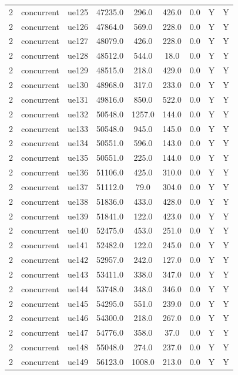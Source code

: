 \begin{table}[ht]
\begin{tabular}{|c|c|c|c|c|c|c|c|c|}
2 & concurrent & ue125 & 47235.0 & 296.0 & 426.0 & 0.0 & Y & Y \\
2 & concurrent & ue126 & 47864.0 & 569.0 & 228.0 & 0.0 & Y & Y \\
2 & concurrent & ue127 & 48079.0 & 426.0 & 228.0 & 0.0 & Y & Y \\
2 & concurrent & ue128 & 48512.0 & 544.0 & 18.0 & 0.0 & Y & Y \\
2 & concurrent & ue129 & 48515.0 & 218.0 & 429.0 & 0.0 & Y & Y \\
2 & concurrent & ue130 & 48968.0 & 317.0 & 233.0 & 0.0 & Y & Y \\
2 & concurrent & ue131 & 49816.0 & 850.0 & 522.0 & 0.0 & Y & Y \\
2 & concurrent & ue132 & 50548.0 & 1257.0 & 144.0 & 0.0 & Y & Y \\
2 & concurrent & ue133 & 50548.0 & 945.0 & 145.0 & 0.0 & Y & Y \\
2 & concurrent & ue134 & 50551.0 & 596.0 & 143.0 & 0.0 & Y & Y \\
2 & concurrent & ue135 & 50551.0 & 225.0 & 144.0 & 0.0 & Y & Y \\
2 & concurrent & ue136 & 51106.0 & 425.0 & 310.0 & 0.0 & Y & Y \\
2 & concurrent & ue137 & 51112.0 & 79.0 & 304.0 & 0.0 & Y & Y \\
2 & concurrent & ue138 & 51836.0 & 433.0 & 428.0 & 0.0 & Y & Y \\
2 & concurrent & ue139 & 51841.0 & 122.0 & 423.0 & 0.0 & Y & Y \\
2 & concurrent & ue140 & 52475.0 & 453.0 & 251.0 & 0.0 & Y & Y \\
2 & concurrent & ue141 & 52482.0 & 122.0 & 245.0 & 0.0 & Y & Y \\
2 & concurrent & ue142 & 52957.0 & 242.0 & 127.0 & 0.0 & Y & Y \\
2 & concurrent & ue143 & 53411.0 & 338.0 & 347.0 & 0.0 & Y & Y \\
2 & concurrent & ue144 & 53748.0 & 348.0 & 346.0 & 0.0 & Y & Y \\
2 & concurrent & ue145 & 54295.0 & 551.0 & 239.0 & 0.0 & Y & Y \\
2 & concurrent & ue146 & 54300.0 & 218.0 & 267.0 & 0.0 & Y & Y \\
2 & concurrent & ue147 & 54776.0 & 358.0 & 37.0 & 0.0 & Y & Y \\
2 & concurrent & ue148 & 55048.0 & 274.0 & 237.0 & 0.0 & Y & Y \\
2 & concurrent & ue149 & 56123.0 & 1008.0 & 213.0 & 0.0 & Y & Y \\

\end{tabular}
\end{table}
